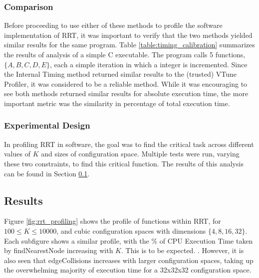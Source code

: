 
    \subsubsection*{Comparison}
        Before proceeding to use either of these methods to profile the software implementation of \ac{RRT}, it was important to verify that the two methods yielded similar results for the same program. Table \ref{table:timing_calibration} summarizes the results of analysis of a simple C executable. The program calls 5 functions, $\{A, B, C, D, E\}$, each a simple iteration in which a integer is incremented. Since the Internal Timing method returned similar results to the (trusted) VTune Profiler, it was considered to be a reliable method. While it was encouraging to see both methods returned similar results for absolute execution time, the more important metric was the similarity in percentage of total execution time.

        

    \subsubsection*{Experimental Design}
        In profiling \ac{RRT} in software, the goal was to find the critical task across different values of $K$ and sizes of configuration space. Multiple tests were run, varying these two constraints, to find this critical function. The results of this analysis can be found in Section \ref{section:rrt_analysis_results}.

\subsection{Results}
\label{section:rrt_analysis_results}
    Figure \ref{fig:rrt_profiling} shows the profile of functions within \ac{RRT}, for $100 \leq K \leq 10000$, and cubic configuration spaces with dimensions $\{4, 8, 16, 32\}$. Each subfigure shows a similar profile, with the \% of CPU Execution Time taken by findNearestNode increasing with $K$. This is to be expected. . However, it is also seen that edgeCollisions increases with larger configuration spaces, taking up the overwhelming majority of execution time for a 32x32x32 configuration space.
    
    \newpage
    

